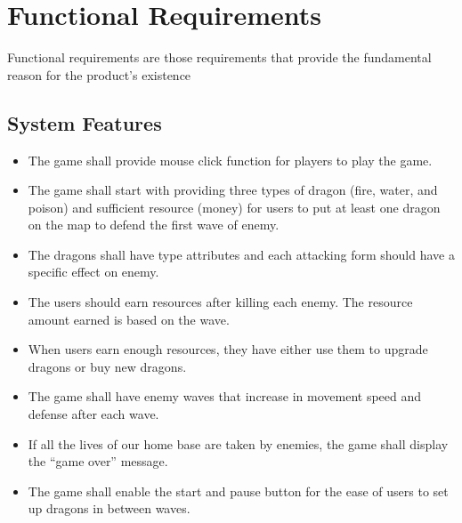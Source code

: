 \documentclass{article}
\begin{document}
\section{Functional Requirements}
Functional requirements are those requirements that provide the fundamental reason for the product's existence

\subsection{System Features}
\begin{itemize}
    \item The game shall provide mouse click function for players to play the game. %
    \item The game shall start with providing three types of dragon (fire, water, and poison) and sufficient resource (money) for users to put at least one dragon on the map to defend the first wave of enemy. %
    \item The dragons shall have type attributes and each attacking form should have a specific effect on enemy. %
    \item The users should earn resources after killing each enemy. The resource amount earned is based on the wave. %
    \item When users earn enough resources, they have either use them to upgrade dragons or buy new dragons. %
    \item The game shall have enemy waves that increase in movement speed and defense after each wave. %
    \item If all the lives of our home base are taken by enemies, the game shall display the “game over” message. %
    \item The game shall enable the start and pause button for the ease of users to set up dragons in between waves. %
\end{itemize}

\newpage
\end{document}
